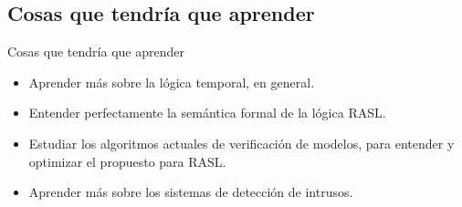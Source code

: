 \documentclass{beamer}
\begin{document}
\subsection{Cosas que tendría que aprender}

\begin{frame}{Cosas que tendría que aprender}

\begin{itemize}
	\item Aprender más sobre la lógica temporal, en general.
\end{itemize}
\begin{itemize}
	\item Entender perfectamente la semántica formal de la lógica RASL.
\end{itemize}
\begin{itemize}
	\item Estudiar los algoritmos actuales de verificación de modelos, para entender y optimizar el propuesto para RASL.
\end{itemize}
\begin{itemize}
	\item Aprender más sobre los sistemas de detección de intrusos.
\end{itemize}

\end{frame}
\end{document}
